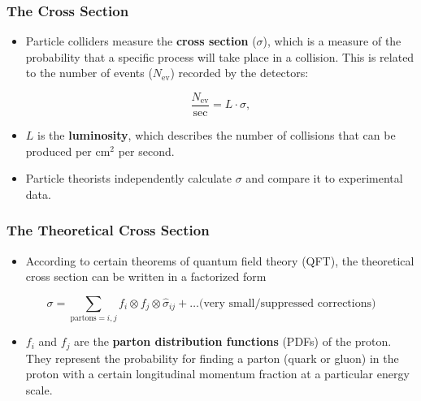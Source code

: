 \documentclass{beamer}
\begin{document}
\begin{frame}
  \frametitle{The Cross Section}

  \begin{itemize}
  \item Particle colliders measure the \textbf{cross section} ($\sigma$), which is a measure of the probability that a specific process will take place in a collision. This is related to the number of events ($N_{\mathrm{ev}}$) recorded by the detectors:
 
  \begin{equation}
   \frac{N_{\mathrm{ev}}}{\mathrm{sec}} = L \cdot \sigma,
  \end{equation}

  \item $L$ is the \textbf{luminosity}, which describes the number of collisions that can be produced per $\mathrm{cm}^2$ per second.

 \item Particle theorists independently calculate $\sigma$ and compare it to experimental data.
  \end{itemize}

\end{frame}


\begin{frame}
  \frametitle{The Theoretical Cross Section}

  \begin{itemize}
  \item According to certain theorems of quantum field theory (QFT), the theoretical cross section can be written in a factorized form    
  \end{itemize}

  \begin{equation}
    \sigma = \sum_{\text{partons}=i,j} f_i \otimes f_j \otimes \hat{\sigma}_{ij} + \ldots \text{(very small/suppressed corrections)}
  \end{equation}

  \begin{itemize}
  \item $f_i$ and $f_j$ are the \textbf{parton distribution functions} (PDFs) of the proton. They represent the probability for finding a parton (quark or gluon) in the proton with a certain longitudinal momentum fraction at a particular energy scale.
  \end{itemize}
\end{frame}
\end{document}
